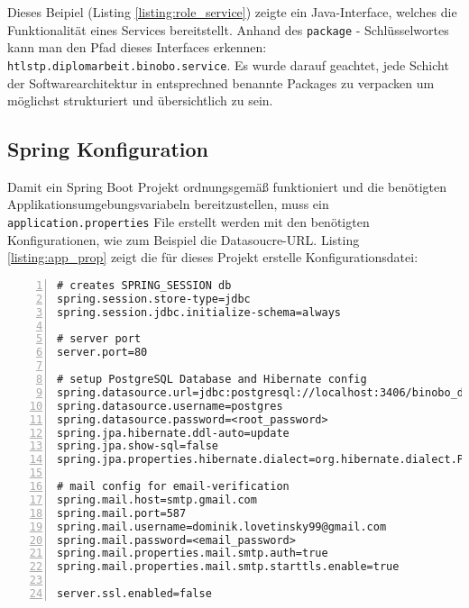 \documentclass[paper=a4,12pt]{scrreprt}
\begin{document}
Dieses Beipiel (Listing \ref{listing:role_service}) zeigte ein Java-Interface, welches die Funktionalität eines Services bereitstellt. Anhand des \texttt{package} - Schlüsselwortes kann man den Pfad dieses Interfaces erkennen: \texttt{htlstp.diplomarbeit.binobo.service}.\newline
Es wurde darauf geachtet, jede Schicht der Softwarearchitektur in entsprechned benannte Packages zu verpacken um möglichst strukturiert und übersichtlich zu sein.\newline

\subsection{Spring Konfiguration}

Damit ein Spring Boot Projekt ordnungsgemäß funktioniert und die benötigten Applikationsumgebungsvariabeln bereitzustellen, muss ein \texttt{application.properties} File erstellt werden mit den benötigten
Konfigurationen, wie zum Beispiel die Datasoucre-URL. Listing \ref{listing:app_prop} zeigt die für dieses Projekt erstelle Konfigurationsdatei:\newline

\begin{lstlisting}[caption={application.properties}, captionpos=b, label={listing:app_prop}, numbers=left,
  stepnumber=1]
# creates SPRING_SESSION db
spring.session.store-type=jdbc
spring.session.jdbc.initialize-schema=always

# server port
server.port=80

# setup PostgreSQL Database and Hibernate config
spring.datasource.url=jdbc:postgresql://localhost:3406/binobo_db
spring.datasource.username=postgres
spring.datasource.password=<root_password>
spring.jpa.hibernate.ddl-auto=update
spring.jpa.show-sql=false
spring.jpa.properties.hibernate.dialect=org.hibernate.dialect.PostgreSQL92Dialect

# mail config for email-verification
spring.mail.host=smtp.gmail.com
spring.mail.port=587
spring.mail.username=dominik.lovetinsky99@gmail.com
spring.mail.password=<email_password>
spring.mail.properties.mail.smtp.auth=true
spring.mail.properties.mail.smtp.starttls.enable=true

server.ssl.enabled=false
\end{lstlisting}
\end{document}
